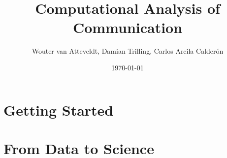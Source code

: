 \documentclass[a4paper,12pt]{book}
\begin{document}
\author{Wouter van Atteveldt, Damian Trilling, Carlos Arcila Calder\'on}
\title{Computational Analysis of Communication}
\date{\today}

\frontmatter
\maketitle
\tableofcontents

\mainmatter

\part{Getting Started}

\setcounter{chapter}{1}



\setcounter{chapter}{5}


\part{From Data to Science}

\setcounter{chapter}{6}


\setcounter{chapter}{8}



\setcounter{chapter}{11}


\backmatter

\begin{small}
\printbibliography
\end{small}
\end{document}
